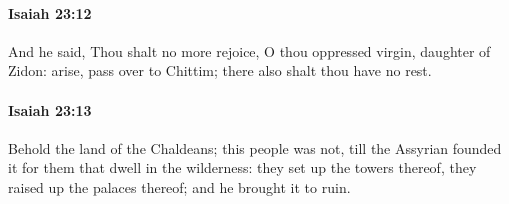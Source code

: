 		\paragraph{Isaiah 23:12} %
			\label{ISAIAH-23-12}

			And he said, Thou shalt no more rejoice, O thou oppressed virgin, daughter of Zidon: arise, pass over to Chittim; there also shalt thou have no rest.


		\paragraph{Isaiah 23:13} %
			\label{ISAIAH-23-13}

			Behold the land of the Chaldeans; this people was not, till the Assyrian founded it for them that dwell in the wilderness: they set up the towers thereof, they raised up the palaces thereof; and he brought it to ruin.


